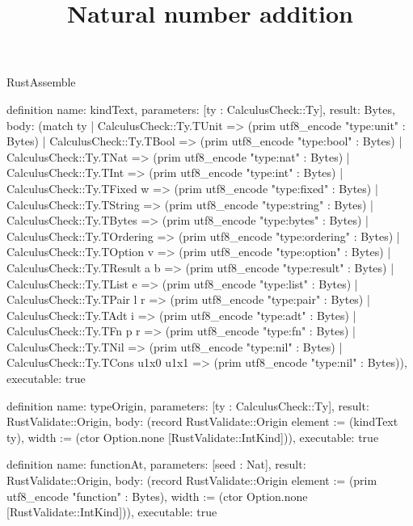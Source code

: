 \begin{lexlean}{RustAssemble}
\title{Natural number addition}
\begin{semanticmodule}
definition{
  name: kindText,
  parameters: [ty : CalculusCheck::Ty],
  result: Bytes,
  body: (match ty
    | CalculusCheck::Ty.TUnit => (prim utf8_encode "type:unit" : Bytes)
    | CalculusCheck::Ty.TBool => (prim utf8_encode "type:bool" : Bytes)
    | CalculusCheck::Ty.TNat => (prim utf8_encode "type:nat" : Bytes)
    | CalculusCheck::Ty.TInt => (prim utf8_encode "type:int" : Bytes)
    | CalculusCheck::Ty.TFixed w => (prim utf8_encode "type:fixed" : Bytes)
    | CalculusCheck::Ty.TString => (prim utf8_encode "type:string" : Bytes)
    | CalculusCheck::Ty.TBytes => (prim utf8_encode "type:bytes" : Bytes)
    | CalculusCheck::Ty.TOrdering => (prim utf8_encode "type:ordering" : Bytes)
    | CalculusCheck::Ty.TOption v => (prim utf8_encode "type:option" : Bytes)
    | CalculusCheck::Ty.TResult a b => (prim utf8_encode "type:result" : Bytes)
    | CalculusCheck::Ty.TList e => (prim utf8_encode "type:list" : Bytes)
    | CalculusCheck::Ty.TPair l r => (prim utf8_encode "type:pair" : Bytes)
    | CalculusCheck::Ty.TAdt i => (prim utf8_encode "type:adt" : Bytes)
    | CalculusCheck::Ty.TFn p r => (prim utf8_encode "type:fn" : Bytes)
    | CalculusCheck::Ty.TNil => (prim utf8_encode "type:nil" : Bytes)
    | CalculusCheck::Ty.TCons u1x0 u1x1 => (prim utf8_encode "type:nil" : Bytes)),
  executable: true
}

definition{
  name: typeOrigin,
  parameters: [ty : CalculusCheck::Ty],
  result: RustValidate::Origin,
  body: (record RustValidate::Origin {element := (kindText ty), width := (ctor Option.none [RustValidate::IntKind])}),
  executable: true
}

definition{
  name: functionAt,
  parameters: [seed : Nat],
  result: RustValidate::Origin,
  body: (record RustValidate::Origin {element := (prim utf8_encode "function" : Bytes), width := (ctor Option.none [RustValidate::IntKind])}),
  executable: true
}


\end{semanticmodule}
\end{lexlean}
